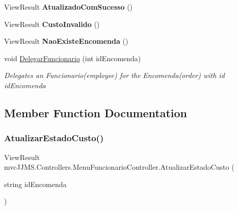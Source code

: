 \begin{DoxyCompactItemize}
\mbox{\label{classmvc_j_j_m_s_1_1_controllers_1_1_menu_funcionario_controller_a0015d1625c1d944fdf5356668e4bf5c3}} 
View\+Result {\bfseries Atualizado\+Com\+Sucesso} ()
\item 
\mbox{\label{classmvc_j_j_m_s_1_1_controllers_1_1_menu_funcionario_controller_a8cc1bf95b689ed613164331ac110f54b}} 
View\+Result {\bfseries Custo\+Invalido} ()
\item 
\mbox{\label{classmvc_j_j_m_s_1_1_controllers_1_1_menu_funcionario_controller_ad9a542852b6a8ea1d9535f022c8a1142}} 
View\+Result {\bfseries Nao\+Existe\+Encomenda} ()
\item 
void \mbox{\hyperlink{classmvc_j_j_m_s_1_1_controllers_1_1_menu_funcionario_controller_a28c1cd92d5ef866174d66b5b61b95bc6}{Delegar\+Funcionario}} (int id\+Encomenda)
\begin{DoxyCompactList}\small\item\em Delegates an Funcionario(employee) for the Encomenda(order) with id id\+Encomenda \end{DoxyCompactList}\end{DoxyCompactItemize}


\subsection{Member Function Documentation}
\mbox{\label{classmvc_j_j_m_s_1_1_controllers_1_1_menu_funcionario_controller_ad45a069bdf6baf93b0851b7eef2d9088}} 
\subsubsection{\texorpdfstring{Atualizar\+Estado\+Custo()}{AtualizarEstadoCusto()}}
{\footnotesize\ttfamily View\+Result mvc\+J\+J\+M\+S.\+Controllers.\+Menu\+Funcionario\+Controller.\+Atualizar\+Estado\+Custo (\begin{DoxyParamCaption}\item[{string}]{id\+Encomenda }\end{DoxyParamCaption})\hspace{0.3cm}{\ttfamily [inline]}}



